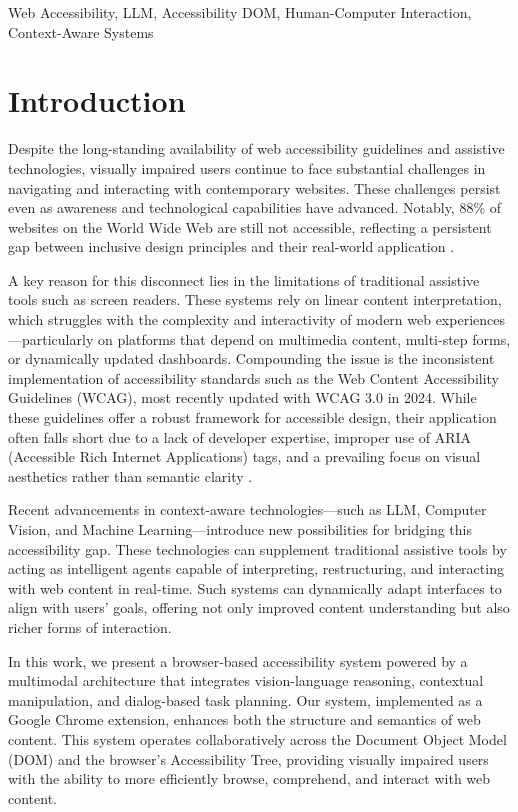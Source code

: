 \documentclass[conference]{IEEEtran}
\begin{document}
\begin{IEEEkeywords}
Web Accessibility, LLM, Accessibility DOM, Human-Computer Interaction, Context-Aware Systems
\end{IEEEkeywords}

\section{Introduction}

Despite the long-standing availability of web accessibility guidelines and assistive technologies, visually impaired users continue to face substantial challenges in navigating and interacting with contemporary websites. These challenges persist even as awareness and technological capabilities have advanced. Notably, 88\% of websites on the World Wide Web are still not accessible, reflecting a persistent gap between inclusive design principles and their real-world application \cite{webaccess2024}.

A key reason for this disconnect lies in the limitations of traditional assistive tools such as screen readers. These systems rely on linear content interpretation, which struggles with the complexity and interactivity of modern web experiences—particularly on platforms that depend on multimedia content, multi-step forms, or dynamically updated dashboards. Compounding the issue is the inconsistent implementation of accessibility standards such as the Web Content Accessibility Guidelines (WCAG), most recently updated with WCAG 3.0 in 2024. While these guidelines offer a robust framework for accessible design, their application often falls short due to a lack of developer expertise, improper use of ARIA (Accessible Rich Internet Applications) tags, and a prevailing focus on visual aesthetics rather than semantic clarity \cite{gbd2021, wcagchallenges2025}.

Recent advancements in context-aware technologies—such as LLM, Computer Vision, and Machine Learning—introduce new possibilities for bridging this accessibility gap. These technologies can supplement traditional assistive tools by acting as intelligent agents capable of interpreting, restructuring, and interacting with web content in real-time. Such systems can dynamically adapt interfaces to align with users' goals, offering not only improved content understanding but also richer forms of interaction.

In this work, we present a browser-based accessibility system powered by a multimodal architecture that integrates vision-language reasoning, contextual manipulation, and dialog-based task planning. Our system, implemented as a Google Chrome extension, enhances both the structure and semantics of web content. This system operates collaboratively across the Document Object Model (DOM) and the browser's Accessibility Tree, providing visually impaired users with the ability to more efficiently browse, comprehend, and interact with web content.
\end{document}
